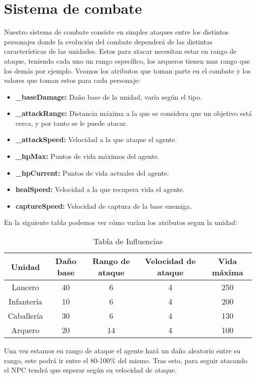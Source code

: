 \section{Sistema de combate}
Nuestro sistema de combate consiste en simples ataques entre los distintos personajes donde la evolución del combate dependerá de las distintas características de las unidades. Estos para atacar necesitan estar en rango de ataque, teniendo cada uno un rango específico, los arqueros tienen mas rango que los demás por ejemplo. Veamos los atributos que toman parte en el combate y los valores que toman estos para cada personaje:
\begin{itemize}
    \item \textbf{\_baseDamage:} Daño base de la unidad, varía según el tipo.
    \item \textbf{\_attackRange:} Distancia máxima a la que se considera que un objetivo está cerca, y por tanto se le puede atacar.
    \item \textbf{\_attackSpeed:} Velocidad a la que ataque el agente.
    \item \textbf{\_hpMax:} Puntos de vida máximos del agente.
    \item \textbf{\_hpCurrent:} Puntos de vida actuales del agente.
    \item \textbf{healSpeed:} Velocidad a la que recupera vida el agente.
    \item \textbf{captureSpeed:} Velocidad de captura de la base enemiga.
\end{itemize}
En la siguiente tabla podemos ver cómo varían los atributos segun la unidad:
\begin{table}[H]
    \centering
    \begin{tabular}{|c|c|c|c|c|}
       \cline{2-5}        
       \textbf{Unidad} & Daño base & Rango de ataque & Velocidad de ataque & Vida máxima \\
        \hline
        Lancero & 40 & 6 & 4 & 250 \\
        \hline
        Infantería & 10 & 6 & 4 & 200 \\
        \hline
        Caballería & 30 & 6 & 4 & 130 \\
        \hline
        Arquero & 20 & 14 & 4 & 100 \\
        \hline
    \end{tabular}
    \caption{Tabla de Influencias}
\end{table}

Una vez estamos en rango de ataque el agente hará un daño aleatorio entre su rango, este podrá ir entre el 80-100\% del mismo. Tras esto, para seguir atacando el NPC tendrá que esperar según su velocidad de ataque.\\

